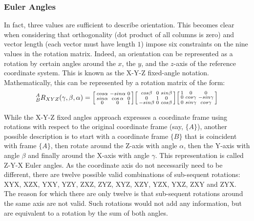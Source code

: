\subsubsection{Euler Angles}
In fact, three values are sufficient to describe orientation.
This becomes clear when considering that orthogonality (dot product of all columns is zero) and vector length (each vector must have length $1$) impose six constraints on the nine values in the rotation matrix.
Indeed, an orientation can be represented as a rotation by certain angles around the $x$, the $y$, and the $z$-axis of the reference coordinate system. This is known as the X-Y-Z fixed-angle notation. Mathematically, this can be represented by a rotation matrix of the form:
\begin{equation}
^A_BR_{XYZ}(\gamma,\beta,\alpha)=\begin{bsmallmatrix}cos\alpha & -sin\alpha & 0\\sin\alpha & \cos\alpha & 0\\0 & 0 & 1\end{bsmallmatrix}\begin{bsmallmatrix}cos\beta& 0 & sin\beta\\0 & 1 & 0\\-sin\beta & 0 & cos\beta\end{bsmallmatrix}\begin{bsmallmatrix}1 & 0 & 0 \\ 0 & cos\gamma & -sin\gamma\\0 & sin\gamma & cos\gamma\end{bsmallmatrix}
\end{equation}

While the X-Y-Z fixed angles approach expresses a coordinate frame using rotations with respect to the original coordinate frame (say, $\{A\}$), another possible description is to start with a coordinate frame $\{B\}$ that is coincident with frame $\{A\}$, then rotate around the Z-axis with angle $ \alpha$, then the Y-axis with angle $ \beta$ and finally around the X-axis with angle $ \gamma$. This representation is called Z-Y-X Euler angles.
As the coordinate axis do not necessarily need to be different, there are twelve possible valid combinations of sub-sequent rotations: XYX, XZX, YXY, YZY, ZXZ, ZYZ, XYZ, XZY, YZX, YXZ, ZXY and ZYX.
The reason for which there are only twelve is that sub-sequent rotations around the same axis are not valid. Such rotations would not add any information, but are equivalent to a rotation by the sum of both angles.

